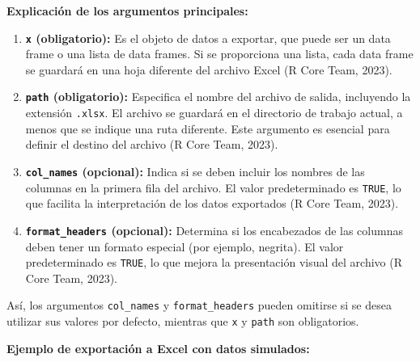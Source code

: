 \documentclass[
  spanish,
  a4paper,
  DIV=11,
  numbers=noendperiod,
  onepage,
  openany]{scrreprt}
\begin{document}
\textbf{Explicación de los argumentos principales:}

\begin{enumerate}
\def\labelenumi{\arabic{enumi}.}
\item
  \textbf{\texttt{x} (obligatorio):} Es el objeto de datos a exportar,
  que puede ser un data frame o una lista de data frames. Si se
  proporciona una lista, cada data frame se guardará en una hoja
  diferente del archivo Excel (R Core Team, 2023).
\item
  \textbf{\texttt{path} (obligatorio):} Especifica el nombre del archivo
  de salida, incluyendo la extensión \texttt{.xlsx}. El archivo se
  guardará en el directorio de trabajo actual, a menos que se indique
  una ruta diferente. Este argumento es esencial para definir el destino
  del archivo (R Core Team, 2023).
\item
  \textbf{\texttt{col\_names} (opcional):} Indica si se deben incluir
  los nombres de las columnas en la primera fila del archivo. El valor
  predeterminado es \texttt{TRUE}, lo que facilita la interpretación de
  los datos exportados (R Core Team, 2023).
\item
  \textbf{\texttt{format\_headers} (opcional):} Determina si los
  encabezados de las columnas deben tener un formato especial (por
  ejemplo, negrita). El valor predeterminado es \texttt{TRUE}, lo que
  mejora la presentación visual del archivo (R Core Team, 2023).
\end{enumerate}

Así, los argumentos \texttt{col\_names} y \texttt{format\_headers}
pueden omitirse si se desea utilizar sus valores por defecto, mientras
que \texttt{x} y \texttt{path} son obligatorios.

\textbf{Ejemplo de exportación a Excel con datos simulados:}
\end{document}
